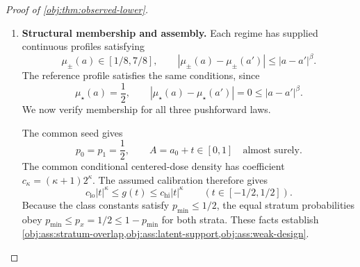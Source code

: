 \documentclass[11pt]{article}
\begin{document}
\begin{proof}[Proof of \cref{obj:thm:observed-lower}]
\begin{enumerate}
For the tail calculation, define
\[
\lambda:=\frac{\ell_{\mathrm M}^2}{\sigma^2}
=\frac{\ell_{\mathrm M}^2L_n}{\tau_{\mathrm M}},
\qquad
D_{\mathrm M}:=
\frac{\gamma C_{\mathrm M}}
{\exp(1)\ell_{\mathrm M}^2}\ge2\exp(1).
\]
The cancellation order and the bound \(B_{\mathrm M}\le2\sqrt{\tau_{\mathrm M}}\) imply
\[
\frac{J}{\exp(1)\lambda}
\ge
D_{\mathrm M}\frac{\tau_{\mathrm M}}{B_{\mathrm M}}
\ge\exp(1)\sqrt{\tau_{\mathrm M}}
\ge2.
\]
In particular \(J\ge2\lambda\). Taking logarithms, and using
\(\log(\exp(1)+1)\le2\), gives
\[
\log\frac{J}{\exp(1)\lambda}
\ge1+\frac12\log\tau_{\mathrm M}
\ge\frac{B_{\mathrm M}}2.
\]
Hence
\[
J\log\frac{J}{\exp(1)\lambda}
\ge
\frac{\gamma C_{\mathrm M}L_n}{B_{\mathrm M}}
\frac{B_{\mathrm M}}2
=
\frac{\gamma C_{\mathrm M}L_n}{2}
\ge4L_n.
\]
The factorial-tail estimate now gives
\[
\mathcal T_{\sigma,\ell_{\mathrm M},J}
\le
2\exp\left(-J\log\frac{J}{\exp(1)\lambda}\right)
\le2\exp(-4L_n).
\]
Using \(h\le\sigma\) for the first inequality and \(0<h\le1\) for the second, the Gaussian prefactor satisfies
\[
\sigma^{-\kappa-1}h^{2\beta+2\kappa+2}\le h^d\le1.
\]
Also \(L_n\ge0\), so
\[
n\exp(-4L_n)
\le n\exp(-L_n)
=\exp(-1)\le1.
\]
It follows that
\[
n\sigma^{-\kappa-1}h^{2\beta+2\kappa+2}
\mathcal T_{\sigma,\ell_{\mathrm M},J}\le2,
\]
and therefore
\[
n\chi^2(Q_\pm,Q_\star)
\le2B_{\mathrm I}\varepsilon^2
\le\log(1+\tau^2).
\]
The same product comparison proves
\[
\operatorname{TV}(Q_{P_+}^n,Q_{P_-}^n)\le\tau.
\]

\item \textbf{Structural membership and assembly.}
Each regime has supplied continuous profiles satisfying
\[
\mu_\pm(a)\in[1/8,7/8],\qquad
|\mu_\pm(a)-\mu_\pm(a')|\le|a-a'|^\beta.
\]
The reference profile satisfies the same conditions, since
\[
\mu_\star(a)=\frac12,\qquad
|\mu_\star(a)-\mu_\star(a')|=0\le|a-a'|^\beta.
\]
We now verify membership for all three pushforward laws.

The common seed gives
\[
p_0=p_1=\frac12,\qquad
A=a_0+t\in[0,1]\quad\text{almost surely}.
\]
The common conditional centered-dose density has coefficient
\(c_\kappa=(\kappa+1)2^\kappa\). The assumed calibration therefore gives
\[
c_{\mathrm{lo}}|t|^\kappa\le g(t)
\le c_{\mathrm{hi}}|t|^\kappa
\qquad(t\in[-1/2,1/2]).
\]
Because the class constants satisfy \(p_{\min}\le1/2\), the equal stratum probabilities obey \(p_{\min}\le p_x=1/2\le1-p_{\min}\) for both strata. These facts establish \cref{obj:ass:stratum-overlap,obj:ass:latent-support,obj:ass:weak-design}.


\end{enumerate}
\end{proof}
\end{document}
